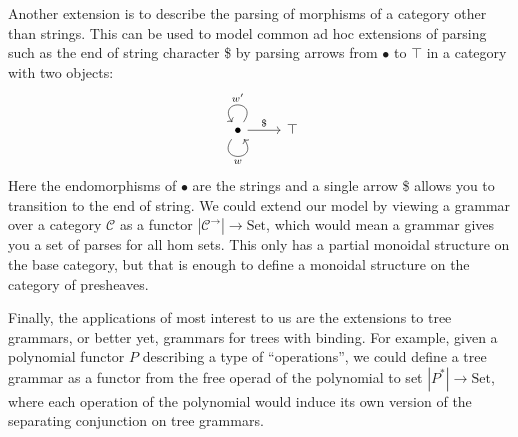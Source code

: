 \documentclass[12pt]{article}
\newcommand{\Set}{\textrm{Set}}
\begin{document}
Another extension is to describe the parsing of morphisms of a
category other than strings. This can be used to model common ad hoc
extensions of parsing such as the end of string character \$ by
parsing arrows from $\bullet$ to $\top$ in a category with two
objects:
\[%
\begin{tikzcd}
\bullet \arrow[r, "\$"] \arrow["w"', loop, distance=2em, in=305, out=235] \arrow["w'"', loop, distance=2em, in=125, out=55] & \top
\end{tikzcd}\]
Here the endomorphisms of $\bullet$ are the strings and a single arrow
\$ allows you to transition to the end of string.  We could extend our
model by viewing a grammar over a category $\mathcal C$ as a functor
$|\mathcal C^\to| \to \Set$, which would mean a grammar gives you a
set of parses for all hom sets. This only has a partial monoidal
structure on the base category, but that is enough to define a
monoidal structure on the category of presheaves.

Finally, the applications of most interest to us are the extensions to
tree grammars, or better yet, grammars for trees with binding. For
example, given a polynomial functor $P$ describing a type of
``operations'', we could define a tree grammar as a functor from the
free operad of the polynomial to set $|P^*| \to \Set$, where each
operation of the polynomial would induce its own version of the
separating conjunction on tree grammars.



\end{document}
